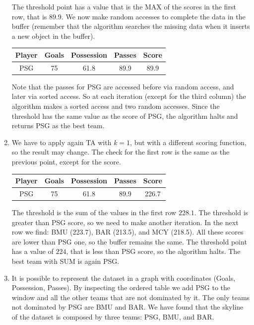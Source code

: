 \documentclass[12pt, a4paper]{report}
\begin{document}
\begin{enumerate}
                The threshold point has a value that is the MAX of the scores in the first row, that is $89.9$. We now make random 
                accesses to complete the data in the buffer (remember that the algorithm searches the missing data when it inserts a 
                new object in the buffer). 
                \begin{table}[H]
                    \centering
                    \begin{tabular}{c|ccc|c}
                    \hline
                    \textbf{Player} & \textbf{Goals} & \textbf{Possession} & \textbf{Passes} & \textbf{Score} \\ \hline
                    PSG             & 75             & 61.8                & 89.9            & 89.9           \\ \hline
                    \end{tabular}
                \end{table}
                Note that the passes for PSG are accessed before via random access, and later via sorted access. So at each iteration (except for 
                the third column) the algorithm makes a sorted access and two random accesses. Since the threshold has the same value as the score 
                of PSG, the algorithm halts and returns PSG as the best team. 
            \item We have to apply again TA with $k=1$, but with a different scoring function, so the result may change. The check for the 
                first row is the same as the previous point, except for the score.
                \begin{table}[H]
                    \centering
                    \begin{tabular}{c|ccc|c}
                    \hline
                    \textbf{Player} & \textbf{Goals} & \textbf{Possession} & \textbf{Passes} & \textbf{Score} \\ \hline
                    PSG             & 75             & 61.8                & 89.9            & 226.7           \\ \hline
                    \end{tabular}
                \end{table}
                The threshold is the sum of the values in the first row $228.1$. The threshold is greater than PSG score, so we need to make another 
                iteration. In the next row we find: BMU (223.7), BAR (213.5), and MCY (218.5). All these scores are lower than PSG one, so the buffer 
                remains the same. The threshold point has a value of $224$, that is less than PSG score, so the algorithm halts. The best team with 
                SUM is again PSG. 
            \item It is possible to represent the dataset in a graph with coordinates (Goals, Possession, Passes). By inspecting the ordered table we 
                add PSG to the window and all the other teams that are not dominated by it. The only teams not dominated by PSG are BMU and BAR. We have 
                found that the skyline of the dataset is composed by three teams: PSG, BMU, and BAR. 
        \end{enumerate}
\end{document}
